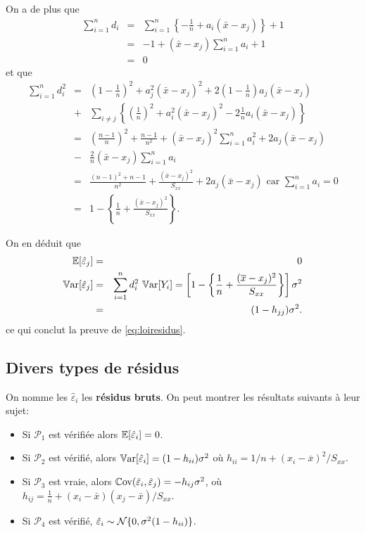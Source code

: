 On a de plus que
\begin{eqnarray*}
\sum_{i=1}^n d_i & = & \sum_{i=1}^n\left\{-\frac{1}{n}+a_i(\bar x-x_j)\right\}+1 \\
& = & -1+ (\bar x -x_j)\sum_{i=1}^n a_i +1 \\
& = & 0
\end{eqnarray*}
et que
\begin{eqnarray*}
\sum_{i=1}^n d_i^2 & = & \left(1-\frac{1}{n}\right)^2+a_j^2(\bar x-x_j)^2+2\left(1-\frac{1}{n}\right)a_j(\bar x-x_j) \\
                   & + & \sum_{i\neq j}\left\{\left(\frac{1}{n}\right)^2+a_i^2(\bar x-x_j)^2-2\frac{1}{n}a_i(\bar x-x_j)\right\} \\
                   & = & \left(\frac{n-1}{n}\right)^2+\frac{n-1}{n^2}+(\bar x-x_j)^2\sum_{i=1}^n a_i^2+2a_j(\bar x-x_j) \\
                   & - & \frac{2}{n}(\bar x-x_j)\sum_{i=1}^n a_i \\
                   & = & \frac{(n-1)^2+n-1}{n^2}+\frac{(\bar x-x_j)^2}{S_{xx}}+2 a_j(\bar x-x_j) \mbox{ car } \sum_{i=1}^n a_i=0\\
                   & = & 1-\left\{\frac{1}{n}+\frac{(\bar x-x_j)^2}{S_{xx}}\right\}.
\end{eqnarray*}

On en déduit que
\begin{eqnarray*}
 \mathbb{E}[\hat{\varepsilon}_j]& = & 0 \\
 \mathbb{V}\text{ar}[\hat{\varepsilon}_j] & = & \sum_{i=1}^n d_i^2 \ \mathbb{V}\text{ar}[Y_i] = \left[1-\left\{\frac{1}{n}+\frac{(\overline{x}-x_j)^2}{S_{xx}}\right\}\right]\sigma^2 \\
 & = & (1-h_{jj})\sigma^2.
\end{eqnarray*}
ce qui conclut la preuve de \ref{eq:loiresidus}.


\subsection{Divers types de résidus}

On nomme les $\hat{\varepsilon}_i$ les \textbf{résidus bruts}. On peut montrer les résultats suivants à leur sujet:
\begin{itemize}
\item[$\bullet$]
Si  $\mathcal{P}_1$ est vérifiée alors $\mathbb{E}[\hat\varepsilon_i]=0$.
\item[$\bullet$] Si $\mathcal{P}_2$ est vérifié, alors
$\mathbb{V}\text{ar}[\hat\varepsilon_i]=(1-h_{ii})\sigma^2$ où $h_{ii}=1/n+(x_i-\overline{x})^2/S_{xx}$.
\item[$\bullet$] Si $\mathcal{P}_3$ est vraie, alors $\mathbb{C}\text{ov}(\hat\varepsilon_i,\hat\varepsilon_j)=-h_{ij}\sigma^2$,
où $h_{ij}=\frac{1}{n}+(x_i-\bar x)(x_j-\bar x)/S_{xx}.$
\item[$\bullet$] Si $\mathcal{P}_4$ est vérifié, $\hat\varepsilon_i\sim
\mathcal{N}\{0,\sigma^2(1-h_{ii})\}$.
\end{itemize}

